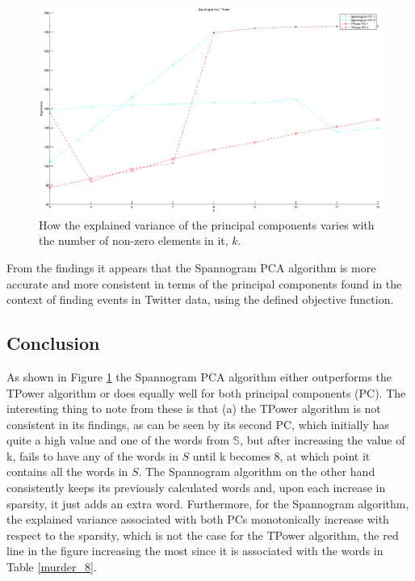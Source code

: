\documentclass[11pt,a4paper]{article}
\begin{document}
\begin{figure}[H]
\centering
\includegraphics[scale=0.3]{Spannogram_vs_TPower_k.eps}
\caption{How the explained variance of the principal components varies with the number of non-zero elements in it, $k$.}
\label{explained_var_graph}
\end{figure}

From the findings it appears that the Spannogram PCA algorithm is more accurate and more consistent in terms of the principal components found in the context of finding events in Twitter data, using the defined objective function. 

\subsection{Conclusion}

As shown in Figure \ref{explained_var_graph} the Spannogram PCA algorithm either outperforms the TPower algorithm or does equally well for both principal components (PC). The interesting thing to note from these is that (a) the TPower algorithm is not consistent in its findings, as can be seen by its second PC, which initially has quite a high value and one of the words from $\mathbb{S}$, but after increasing the value of k, fails to have any of the words in $S$ until k becomes 8, at which point it contains all the words in $S$. The Spannogram algorithm on the other hand consistently keeps its previously calculated words and, upon each increase in sparsity, it just adds an extra word. Furthermore, for the Spannogram algorithm, the explained variance associated with both PCs monotonically increase with respect to the sparsity, which is not the case for the TPower algorithm, the red line in the figure increasing the most since it is associated with the words in Table \ref{murder_8}.
\end{document}
